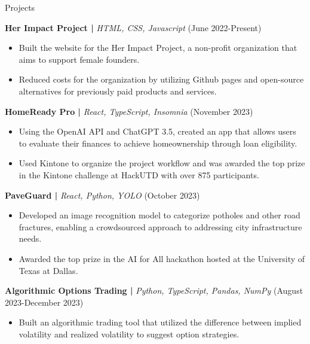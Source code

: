 \documentclass[]{mcdowellcv}
\begin{document}
	\begin{cvsection}{Projects}
		\begin{cvsubsection}{}{}{}	
				\textbf{Her Impact Project | }\textit{HTML, CSS, Javascript} \hfill{(June 2022-Present)}
				\begin{itemize}
					\item Built the website for the Her Impact Project, a non-profit organization that aims to support female founders.
					\item Reduced costs for the organization by utilizing Github pages and open-source alternatives for previously paid products and services.
				\end{itemize}
				\medskip
				\textbf{HomeReady Pro | }\textit{React, TypeScript, Insomnia} \hfill{(November 2023)} 
				\begin{itemize}
					\item Using the OpenAI API and ChatGPT 3.5, created an app that allows users to evaluate their finances to achieve homeownership through loan eligibility. 
					\item Used Kintone to organize the project workflow and was awarded the top prize in the Kintone challenge at HackUTD with over 875 participants.
				\end{itemize}
				\medskip
				\textbf{PaveGuard | }\textit{React, Python, YOLO} \hfill{(October 2023)}
				\begin{itemize}
					\item Developed an image recognition model to categorize potholes and other road fractures, enabling a crowdsourced approach to addressing city infrastructure needs.
					\item Awarded the top prize in the AI for All hackathon hosted at the University of Texas at Dallas.
				\end{itemize}
				\medskip
				\textbf{Algorithmic Options Trading | }\textit{Python, TypeScript, Pandas, NumPy} \hfill{(August 2023-December 2023)}
				\begin{itemize}
					\item Built an algorithmic trading tool that utilized the difference between implied volatility and realized volatility to suggest option strategies.
				\end{itemize}
		\end{cvsubsection}
	\end{cvsection}
\end{document}
